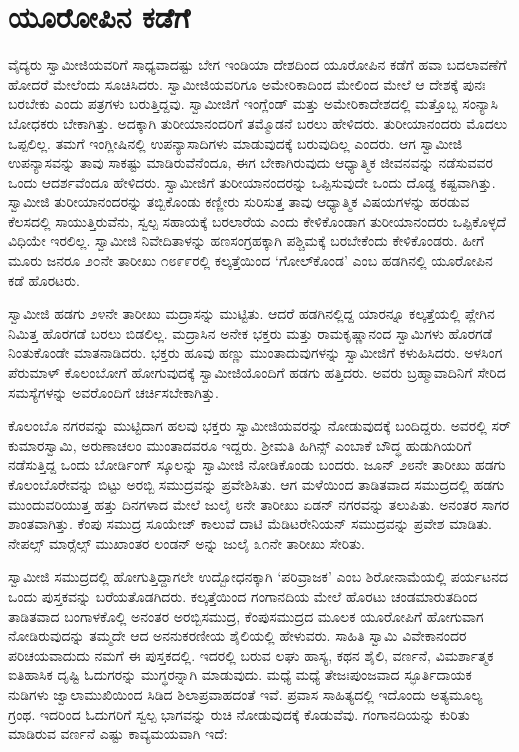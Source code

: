 
\chapter{ಯೂರೋಪಿನ ಕಡೆಗೆ }

 ವೈದ್ಯರು ಸ್ವಾಮೀಜಿಯವರಿಗೆ ಸಾಧ್ಯವಾದಷ್ಟು ಬೇಗ ಇಂಡಿಯಾ ದೇಶದಿಂದ ಯೂರೋಪಿನ ಕಡೆಗೆ ಹವಾ ಬದಲಾವಣೆಗೆ ಹೋದರೆ ಮೇಲೆಂದು ಸೂಚಿಸಿದರು. ಸ್ವಾಮೀಜಿಯವರಿಗೂ ಅಮೇರಿಕಾದಿಂದ ಮೇಲಿಂದ ಮೇಲೆ ಆ ದೇಶಕ್ಕೆ ಪುನಃ ಬರಬೇಕು ಎಂದು ಪತ್ರಗಳು ಬರುತ್ತಿದ್ದವು. ಸ್ವಾಮೀಜಿಗೆ ಇಂಗ್ಲೆಂಡ್ ಮತ್ತು ಅಮೇರಿಕಾದೇಶದಲ್ಲಿ ಮತ್ತೊಬ್ಬ ಸಂನ್ಯಾಸಿ ಬೋಧಕರು ಬೇಕಾಗಿತ್ತು. ಅದಕ್ಕಾಗಿ ತುರೀಯಾನಂದರಿಗೆ ತಮ್ಮೊಡನೆ ಬರಲು ಹೇಳಿದರು. ತುರೀಯಾನಂದರು ಮೊದಲು ಒಪ್ಪಲಿಲ್ಲ. ತಮಗೆ ಇಂಗ್ಲೀಷಿನಲ್ಲಿ ಉಪನ್ಯಾಸಾದಿಗಳು ಮಾಡುವುದಕ್ಕೆ ಬರುವುದಿಲ್ಲ ಎಂದರು. ಆಗ ಸ್ವಾಮೀಜಿ ಉಪನ್ಯಾಸವನ್ನು ತಾವು ಸಾಕಷ್ಟು ಮಾಡಿರುವೆನೆಂದೂ, ಈಗ ಬೇಕಾಗಿರುವುದು ಆಧ್ಯಾತ್ಮಿಕ ಜೀವನವನ್ನು ನಡೆಸುವವರ ಒಂದು ಆದರ್ಶವೆಂದೂ ಹೇಳಿದರು. ಸ್ವಾಮೀಜಿಗೆ ತುರೀಯಾನಂದರನ್ನು ಒಪ್ಪಿಸುವುದೇ ಒಂದು ದೊಡ್ಡ ಕಷ್ಟವಾಗಿತ್ತು. ಸ್ವಾಮೀಜಿ ತುರೀಯಾನಂದರನ್ನು ತಬ್ಬಿಕೊಂಡು ಕಣ್ಣೀರು ಸುರಿಸುತ್ತ ತಾವು ಆಧ್ಯಾತ್ಮಿಕ ವಿಷಯಗಳನ್ನು ಹರಡುವ ಕೆಲಸದಲ್ಲಿ ಸಾಯುತ್ತಿರುವೆನು, ಸ್ವಲ್ಪ ಸಹಾಯಕ್ಕೆ ಬರಲಾರೆಯ ಎಂದು ಕೇಳಿಕೊಂಡಾಗ ತುರೀಯಾನಂದರು ಒಪ್ಪಿಕೊಳ್ಳದೆ ವಿಧಿಯೇ ಇರಲಿಲ್ಲ. ಸ್ವಾಮೀಜಿ ನಿವೇದಿತಾಳನ್ನು ಹಣಸಂಗ್ರಹಕ್ಕಾಗಿ ಪಶ್ಚಿಮಕ್ಕೆ ಬರಬೇಕೆಂದು ಕೇಳಿಕೊಂಡರು. ಹೀಗೆ ಮೂರು ಜನರೂ ೨೦ನೇ ತಾರೀಖು ೧೮೯೯ರಲ್ಲಿ ಕಲ್ಕತ್ತೆಯಿಂದ ‘ಗೋಲ್‍ಕೊಂಡ’ ಎಂಬ ಹಡಗಿನಲ್ಲಿ ಯೂರೋಪಿನ ಕಡೆ ಹೊರಟರು. 

 ಸ್ವಾಮೀಜಿ ಹಡಗು ೨೪ನೇ ತಾರೀಖು ಮದ್ರಾಸನ್ನು ಮುಟ್ಟಿತು. ಆದರೆ ಹಡಗಿನಲ್ಲಿದ್ದ ಯಾರನ್ನೂ ಕಲ್ಕತ್ತೆಯಲ್ಲಿ ಪ್ಲೇಗಿನ ನಿಮಿತ್ತ ಹೊರಗಡೆ ಬರಲು ಬಿಡಲಿಲ್ಲ. ಮದ್ರಾಸಿನ ಅನೇಕ ಭಕ್ತರು ಮತ್ತು ರಾಮಕೃಷ್ಣಾನಂದ ಸ್ವಾಮಿಗಳು ಹೊರಗಡೆ ನಿಂತುಕೊಂಡೇ ಮಾತನಾಡಿದರು. ಭಕ್ತರು ಹೂವು ಹಣ್ಣು ಮುಂತಾದುವುಗಳನ್ನು ಸ್ವಾಮೀಜಿಗೆ ಕಳುಹಿಸಿದರು. ಅಳಸಿಂಗ ಪೆರುಮಾಳ್ ಕೊಲಂಬೋಗೆ ಹೋಗುವುದಕ್ಕೆ ಸ್ವಾಮೀಜಿಯೊಂದಿಗೆ ಹಡಗು ಹತ್ತಿದರು. ಅವರು ಬ್ರಹ್ಮಾವಾದಿನಿಗೆ ಸೇರಿದ ಸಮಸ್ಯೆಗಳನ್ನು ಅವರೊಂದಿಗೆ ಚರ್ಚಿಸಬೇಕಾಗಿತ್ತು. 

 ಕೊಲಂಬೊ ನಗರವನ್ನು ಮುಟ್ಟಿದಾಗ ಹಲವು ಭಕ್ತರು ಸ್ವಾಮೀಜಿಯವರನ್ನು ನೋಡುವುದಕ್ಕೆ ಬಂದಿದ್ದರು. ಅವರಲ್ಲಿ ಸರ್ ಕುಮಾರಸ್ವಾಮಿ, ಅರುಣಾಚಲಂ ಮುಂತಾದವರೂ ಇದ್ದರು. ಶ‍್ರೀಮತಿ ಹಿಗಿನ್ಸ್ ಎಂಬಾಕೆ ಬೌದ್ಧ ಹುಡುಗಿಯರಿಗೆ ನಡೆಸುತ್ತಿದ್ದ ಒಂದು ಬೋರ್ಡಿಂಗ್ ಸ್ಕೂಲನ್ನು ಸ್ವಾಮೀಜಿ ನೋಡಿಕೊಂಡು ಬಂದರು. ಜೂನ್ ೨೮ನೇ ತಾರೀಖು ಹಡಗು ಕೊಲಂಬೊರೇವನ್ನು ಬಿಟ್ಟು ಅರಬ್ಬಿ ಸಮುದ್ರವನ್ನು ಪ್ರವೇಶಿಸಿತು. ಆಗ ಮಳೆಯಿಂದ ತಾಡಿತವಾದ ಸಮುದ್ರದಲ್ಲಿ ಹಡಗು ಮುಂದುವರಿಯುತ್ತ ಹತ್ತು ದಿನಗಳಾದ ಮೇಲೆ ಜುಲೈ ೮ನೇ ತಾರೀಖು ಏಡನ್ ನಗರವನ್ನು ತಲುಪಿತು. ಅನಂತರ ಸಾಗರ ಶಾಂತವಾಗಿತ್ತು. ಕೆಂಪು ಸಮುದ್ರ ಸೂಯೇಜ್ ಕಾಲುವೆ ದಾಟಿ ಮೆಡಿಟರೇನಿಯನ್ ಸಮುದ್ರವನ್ನು ಪ್ರವೇಶ ಮಾಡಿತು. ನೇಪಲ್ಸ್ ಮಾರ್‍ಸೆಲ್ಸ್ ಮುಖಾಂತರ ಲಂಡನ್ ಅನ್ನು ಜುಲೈ ೩೧ನೇ ತಾರೀಖು ಸೇರಿತು. 

 ಸ್ವಾಮೀಜಿ ಸಮುದ್ರದಲ್ಲಿ ಹೋಗುತ್ತಿದ್ದಾಗಲೇ ಉದ್ಬೋಧನಕ್ಕಾಗಿ ‘ಪರಿವ್ರಾಜಕ’ ಎಂಬ ಶಿರೋನಾಮೆಯಲ್ಲಿ ಪರ್ಯಟನದ ಒಂದು ಪುಸ್ತಕವನ್ನು ಬರೆಯತೊಡಗಿದರು. ಕಲ್ಕತ್ತೆಯಿಂದ ಗಂಗಾನದಿಯ ಮೇಲೆ ಹೊರಟು ಚಂಡಮಾರುತದಿಂದ ತಾಡಿತವಾದ ಬಂಗಾಳಕೊಲ್ಲಿ ಅನಂತರ ಅರಬ್ಬಿಸಮುದ್ರ, ಕೆಂಪುಸಮುದ್ರದ ಮೂಲಕ ಯೂರೋಪಿಗೆ ಹೋಗುವಾಗ ನೋಡಿರುವುದನ್ನು ತಮ್ಮದೇ ಆದ ಅನನುಕರಣೀಯ ಶೈಲಿಯಲ್ಲಿ ಹೇಳುವರು. ಸಾಹಿತಿ ಸ್ವಾಮಿ ವಿವೇಕಾನಂದರ ಪರಿಚಯವಾದುದು ನಮಗೆ ಈ ಪುಸ್ತಕದಲ್ಲಿ. ಇದರಲ್ಲಿ ಬರುವ ಲಘು ಹಾಸ್ಯ, ಕಥನ ಶೈಲಿ, ವರ್ಣನೆ, ವಿಮರ್ಶಾತ್ಮಕ ಐತಿಹಾಸಿಕ ದೃಷ್ಟಿ ಓದುಗರನ್ನು ಮುಗ್ಧರನ್ನಾಗಿ ಮಾಡುವುದು. ಮಧ್ಯೆ ಮಧ್ಯೆ ತೇಜಃಪುಂಜವಾದ ಸ್ಫೂರ್ತಿದಾಯಕ ನುಡಿಗಳು ಜ್ವಾಲಾಮುಖಿಯಿಂದ ಸಿಡಿದ ಶಿಲಾಪ್ರವಾಹದಂತೆ ಇವೆ. ಪ್ರವಾಸ ಸಾಹಿತ್ಯದಲ್ಲಿ ಇದೊಂದು ಅತ್ಯಮೂಲ್ಯ ಗ್ರಂಥ. ಇದರಿಂದ ಓದುಗರಿಗೆ ಸ್ವಲ್ಪ ಭಾಗವನ್ನು ರುಚಿ ನೋಡುವುದಕ್ಕೆ ಕೊಡುವೆವು. ಗಂಗಾನದಿಯನ್ನು ಕುರಿತು ಮಾಡಿರುವ ವರ್ಣನೆ ಎಷ್ಟು ಕಾವ್ಯಮಯವಾಗಿ ಇದೆ: 

